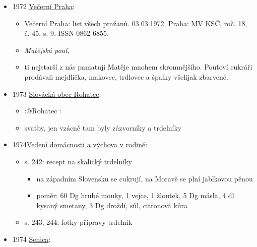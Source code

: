 \begin{itemize}
\begin{itemize}
    \begin{itemize}
    \tightlist
    \item
      přehled druhů a funkce lidového pečiva,
    \item
      spousta druhů pečiva spojená s narozením dítěte, někde koblihy,
      šišky, boží milosti, trdelníky, preclíky
    \end{itemize}
  \end{itemize}
\item
  1972
  \href{https://ceskadigitalniknihovna.cz/uuid/uuid:94cb2830-81d2-11ec-b27f-001b63bd97ba}{Večerní
  Praha}:

  \begin{itemize}
  \tightlist
  \item
    Večerní Praha: list všech pražanů. 03.03.1972. Praha: MV KSČ, roč.
    18, č. 45, s. 9. ISSN 0862-6855.
  \item
    \emph{Matějská pouť}, 
  \item
    ti nejstarší z nás pamatují Matěje mnohem skromnějšího. Pouťoví
    cukráři prodávali mejdlíčka, makovec, trdlovec a špalky všelijak
    zbarvené.
  \end{itemize}
\item
  1973
  \href{https://ceskadigitalniknihovna.cz/view/uuid:16e70800-3350-11e8-9dd8-005056827e51?page=uuid\%3Ab94f2080-53a5-11e8-946a-005056825209&fulltext=trdeln\%C3\%ADk\%20OR\%20trdeln\%C3\%ADky\%20OR\%20trdeln\%C3\%ADk\%C5\%AF&source=mzk}{Slovácká
  obec Rohatec}:

  \begin{itemize}
  \tightlist
  \item
    :@Rohatec :
  \item
    svatby, jen vzácně tam byly zázvorníky a trdelníky
  \end{itemize}
\item
  1974\href{https://ceskadigitalniknihovna.cz/view/uuid:01efbca0-9ed8-11e3-8e84-005056827e51?page=uuid\%3A605e51f0-a73b-11e3-87a3-001018b5eb5c&fulltext=trdeln\%C3\%ADk\%20OR\%20trdeln\%C3\%ADky\%20OR\%20trdeln\%C3\%ADk\%C5\%AF&source=mzk}{Vedení
  domácnosti a výchova v rodině}:

  \begin{itemize}
  \tightlist
  \item
    s. 242: recept na skalický trdelníky

    \begin{itemize}
    \tightlist
    \item
      na západním Slovensku se cukrují, na Moravě se plní jablkovou
      pěnou
    \item
      poměr: 60 Dg hrubé mouky, 1 vejce, 1 žloutek, 5 Dg másla, 4 dl
      kysaný smetany, 3 Dg droždí, sůl, citronová kůra
    \end{itemize}
  \item
    s. 243, 244: fotky přípravy trdelník
  \end{itemize}
\item
  1974
  \href{https://dikda.snk.sk/uuid/uuid:d94332c2-6255-4120-ae75-24a5112dd9b9}{Senica}:


\end{itemize}
